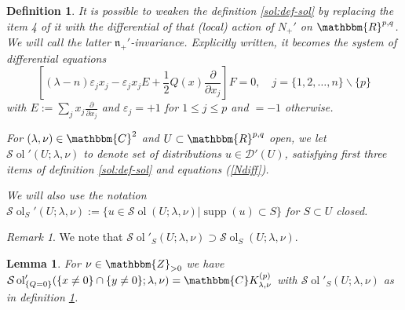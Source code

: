 \documentclass[12pt]{article}
\newcommand{\assign}{:=}
\newcommand{\tmop}[1]{\ensuremath{\operatorname{#1}}}
\newtheorem{definition}[proposition]{Definition}
\newtheorem{lemma}[proposition]{Lemma}
\theoremstyle{remark}
\newtheorem{remark}[proposition]{Remark}
\begin{document}
\begin{definition}
  \label{n-nonequiv:def-solprime}It is possible to weaken the definition
  \ref{sol:def-sol} by replacing the item 4 of it with the differential of
  that (local) action of $N_+'$ on $\mathbbm{R}^{p, q}$. We will call the
  latter $\mathfrak{n}_+'$-invariance. Explicitly written, it becomes the
  system of differential equations
  \begin{equation}
    \left[ (\lambda - n) \varepsilon_j x_j - \varepsilon_j x_j E + \frac{1}{2}
    Q (x) \frac{\partial}{\partial x_j} \right] F = 0, \quad j = \{ 1, 2,
    \ldots, n \} \backslash \{ p \} \label{Ndiff}
  \end{equation}
  with $E \assign \sum_j x_j  \frac{\partial}{\partial x_j}$ and
  $\varepsilon_j = + 1$ for $1 \leq j \leq p$ and $= - 1$ otherwise.
  
  For $(\lambda, \nu) \in \mathbbm{C}^2$ and $U \subset \mathbbm{R}^{p, q}$
  open, we let $\mathcal{S} \tmop{ol}' (U ; \lambda, \nu)$ to denote set of
  distributions $u \in \mathcal{D}' (U)$, satisfying first three items of
  definition \ref{sol:def-sol} and equations (\ref{Ndiff}).
  
  We will also use the notation $\mathcal{S} \tmop{ol}_S' (U ; \lambda, \nu)
  \assign \{ u \in \mathcal{S} \tmop{ol} (U ; \lambda, \nu) | \tmop{supp} (u)
  \subset S \}$ for $S \subset U$ closed.
\end{definition}

\begin{remark}
  We note that $\mathcal{S} \tmop{ol}'_S (U ; \lambda, \nu) \supset
  \mathcal{S} \tmop{ol}_S (U ; \lambda, \nu)$.
\end{remark}

\begin{lemma}
  \label{lem:sing-q-6}For $\nu \in \mathbbm{Z}_{> 0}$ we have $\mathcal{S}
  \tmop{ol}_{\{ Q = 0 \}}' (\{ x \neq 0 \} \cap \{ y \neq 0 \} ; \lambda, \nu)
  =\mathbbm{C}K^{(p)}_{\lambda, \nu}$ with $\mathcal{S} \tmop{ol}'_S (U ;
  \lambda, \nu)$ as in definition \ref{n-nonequiv:def-solprime}.
\end{lemma}
\end{document}
